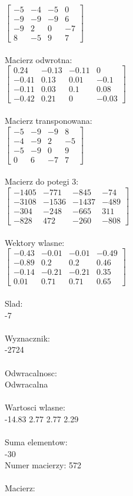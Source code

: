 \documentclass[a4paper,12pt]{article}
\begin{document}
$\begin{bmatrix} -5&-4&-5&0\\-9&-9&-9&6\\-9&2&0&-7\\8&-5&9&7 \end{bmatrix}$
\\
\\
Macierz odwrotna:\\

$\begin{bmatrix} 0.24&-0.13&-0.11&0\\-0.41&0.13&0.01&-0.1\\-0.11&0.03&0.1&0.08\\-0.42&0.21&0&-0.03 \end{bmatrix}$
\\
\\
Macierz transponowana:\\

$\begin{bmatrix} -5&-9&-9&8\\-4&-9&2&-5\\-5&-9&0&9\\0&6&-7&7 \end{bmatrix}$
\\
\\
Macierz do potegi 3:\\

$\begin{bmatrix} -1405&-771&-845&-74\\-3108&-1536&-1437&-489\\-304&-248&-665&311\\-828&472&-260&-808 \end{bmatrix}$
\\
\\
Wektory wlasne:\\

$\begin{bmatrix} -0.43&-0.01&-0.01&-0.49\\-0.89&0.2&0.2&0.46\\-0.14&-0.21&-0.21&0.35\\0.01&0.71&0.71&0.65 \end{bmatrix}$
\\
\\
Slad:\\
-7
\\
\\
Wyznacznik:\\
-2724
\\
\\
Odwracalnosc:\\
Odwracalna
\\
\\
Wartosci wlasne:\\
-14.83 2.77 2.77 2.29
\\
\\
Suma elementow:\\
-30
\\
\newpage
Numer macierzy:
572
\\
\\
Macierz:\\
\end{document}
